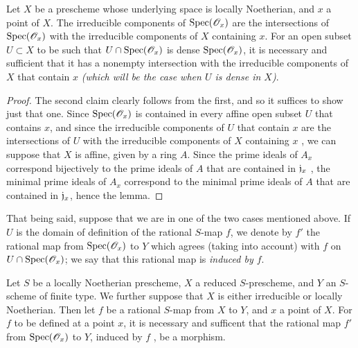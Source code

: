 \begin{lem}[7.2.8.1]
\label{1.7.2.8.1}
Let $X$ be a prescheme whose underlying space is locally Noetherian, and $x$ a point of $X$.
The irreducible components of ${\mathop{\mathrm{Spec}}\nolimits}(\mathscr{O}_x)$ are the intersections of ${\mathop{\mathrm{Spec}}\nolimits}(\mathscr{O}_x)$ with the irreducible components of $X$ containing $x$.
For an open subset $U\subset X$ to be such that $U\cap{\mathop{\mathrm{Spec}}\nolimits}(\mathscr{O}_x)$ is dense ${\mathop{\mathrm{Spec}}\nolimits}(\mathscr{O}_x)$, it is necessary and sufficient that it has a nonempty intersection with the irreducible components of $X$ that contain $x$ \emph{(which will be the case when $U$ is \emph{dense} in $X$)}.
\end{lem}

\begin{proof}
\label{proof-1.7.2.8.1}
The second claim clearly follows from the first, and so it suffices to show just that one.
Since ${\mathop{\mathrm{Spec}}\nolimits}(\mathscr{O}_x)$ is contained in every affine open subset $U$ that contains $x$, and since the irreducible components of $U$ that contain $x$ are the intersections of $U$ with the irreducible components of $X$ containing $x$ , we can suppose that $X$ is affine, given by a ring $A$.
Since the prime ideals of $A_x$ correspond bijectively to the prime ideals of $A$ that are
contained in $\mathfrak{j}_x$ , the minimal prime ideals of $A_x$ correspond to the minimal prime ideals of $A$ that are contained in $\mathfrak{j}_x$, hence the lemma.
\end{proof}

That being said, suppose that we are in one of the two cases mentioned above.
If $U$ is the domain of definition of the rational $S$-map $f$, we denote by $f'$ the rational map from ${\mathop{\mathrm{Spec}}\nolimits}(\mathscr{O}_x)$ to $Y$ which agrees (taking  into account) with $f$ on $U\cap{\mathop{\mathrm{Spec}}\nolimits}(\mathscr{O}_x)$; we say that this rational map is \emph{induced by $f$}.

\begin{prop}[7.2.9]
\label{1.7.2.9}
Let $S$ be a locally Noetherian prescheme, $X$ a reduced $S$-prescheme, and $Y$ an $S$-scheme of finite type.
We further suppose that $X$ is either irreducible or locally Noetherian.
Then let $f$ be a rational $S$-map from $X$ to $Y$, and $x$ a point of $X$.
For $f$ to be defined at a point $x$, it is necessary and sufficent that the rational map $f'$ from ${\mathop{\mathrm{Spec}}\nolimits}(\mathscr{O}_x)$ to $Y$, induced by $f$ , be a morphism.
\end{prop}

